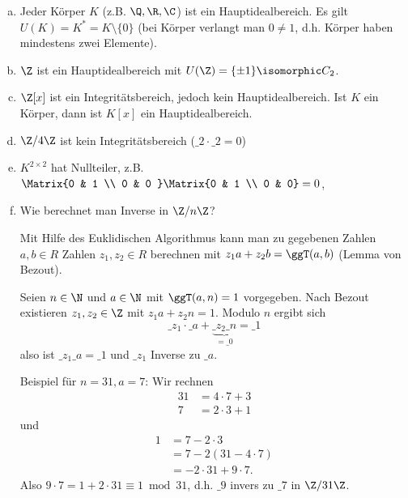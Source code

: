 \begin{ex} \label{1.2}
	\begin{enumerate}[a)]
		\item
			Jeder Körper $K$ (z.B. $\Q, \R, \C$) ist ein Hauptidealbereich.
			Es gilt $U(K) = K^* = K \setminus \{0\}$ (bei Körper verlangt man $0 \neq 1$, d.h. Körper haben mindestens zwei Elemente).
		\item
			$\Z$ ist ein Hauptidealbereich mit $U(\Z) = \{ \pm 1 \} \isomorphic C_2$.
		\item
			$\Z[x]$ ist ein Integritätsbereich, jedoch kein Hauptidealbereich.
			Ist $K$ ein Körper, dann ist $K[x]$ ein Hauptidealbereich.
		\item
			$\Z / 4 \Z$ ist kein Integritätsbereich ($\_ 2 \cdot \_ 2 = 0$)
		\item
			$K^{2\times 2}$ hat Nullteiler, z.B. $\Matrix{0 & 1 \\ 0 & 0 } \Matrix{0 & 1 \\ 0 & 0} = 0$,
		\item
			Wie berechnet man Inverse in $\Z / n \Z$?

			Mit Hilfe des Euklidischen Algorithmus kann man zu gegebenen Zahlen $a,b \in R$ Zahlen $z_1, z_2 \in R$ berechnen mit $z_1 a + z_2 b = \ggT(a,b)$ (Lemma von Bezout).

			Seien $n \in \N$ und $a \in \N$ mit $\ggT(a, n) = 1$ vorgegeben.
			Nach Bezout existieren $z_1, z_2 \in \Z$ mit $z_1 a + z_2 n = 1$.
			Modulo $n$ ergibt sich
			\[
				\_ z_1 \cdot \_ a + \underbrace{\_ z_2 \_ n}_{=\_ 0} = \_ 1
			\]
			also ist $\_z_1 \_ a = \_ 1$ und $\_ z_1$ Inverse zu $\_ a$.

			Beispiel für $n = 31, a = 7$:
			Wir rechnen
			\begin{align*}
				31 &= 4 \cdot 7 + 3 \\
				7 &= 2 \cdot 3 + 1
			\end{align*}
			und
			\begin{align*}
				1 &= 7 - 2 \cdot 3 \\
				&= 7 - 2 (31 - 4 \cdot 7) \\
				&= -2 \cdot 31 + 9 \cdot 7.
			\end{align*}
			Also $9 \cdot 7 = 1 + 2 \cdot 31 \equiv 1 \bmod 31$, d.h. $\_ 9$ invers zu $\_ 7$ in $\Z / 31 \Z$.
	\end{enumerate}
\end{ex}

